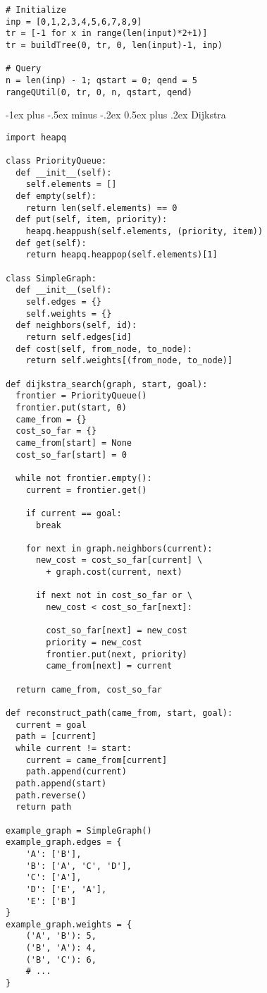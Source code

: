\documentclass[10pt,landscape]{article}
\makeatletter
\renewcommand{\section}{\@startsection{section}{1}{0mm}%
                                {-1ex plus -.5ex minus -.2ex}%
                                {0.5ex plus .2ex}%
                                {\normalfont\large\bfseries}}
\makeatother
\begin{document}
\begin{multicols}{3}
\begin{verbatim}
# Initialize
inp = [0,1,2,3,4,5,6,7,8,9]
tr = [-1 for x in range(len(input)*2+1)]
tr = buildTree(0, tr, 0, len(input)-1, inp)

# Query
n = len(inp) - 1; qstart = 0; qend = 5
rangeQUtil(0, tr, 0, n, qstart, qend)
\end{verbatim}

\section{Dijkstra}


\begin{verbatim}
import heapq

class PriorityQueue:
  def __init__(self):
    self.elements = []
  def empty(self):
    return len(self.elements) == 0
  def put(self, item, priority):
    heapq.heappush(self.elements, (priority, item))
  def get(self):
    return heapq.heappop(self.elements)[1]

class SimpleGraph:
  def __init__(self):
    self.edges = {}
    self.weights = {}
  def neighbors(self, id):
    return self.edges[id]
  def cost(self, from_node, to_node):
    return self.weights[(from_node, to_node)]

def dijkstra_search(graph, start, goal):
  frontier = PriorityQueue()
  frontier.put(start, 0)
  came_from = {}
  cost_so_far = {}
  came_from[start] = None
  cost_so_far[start] = 0

  while not frontier.empty():
    current = frontier.get()

    if current == goal:
      break

    for next in graph.neighbors(current):
      new_cost = cost_so_far[current] \
        + graph.cost(current, next)

      if next not in cost_so_far or \
        new_cost < cost_so_far[next]:

        cost_so_far[next] = new_cost
        priority = new_cost
        frontier.put(next, priority)
        came_from[next] = current

  return came_from, cost_so_far

def reconstruct_path(came_from, start, goal):
  current = goal
  path = [current]
  while current != start:
    current = came_from[current]
    path.append(current)
  path.append(start)
  path.reverse()
  return path

example_graph = SimpleGraph()
example_graph.edges = {
    'A': ['B'],
    'B': ['A', 'C', 'D'],
    'C': ['A'],
    'D': ['E', 'A'],
    'E': ['B']
}
example_graph.weights = {
    ('A', 'B'): 5,
    ('B', 'A'): 4,
    ('B', 'C'): 6,
    # ...
}


\end{verbatim}
\end{multicols}
\end{document}
